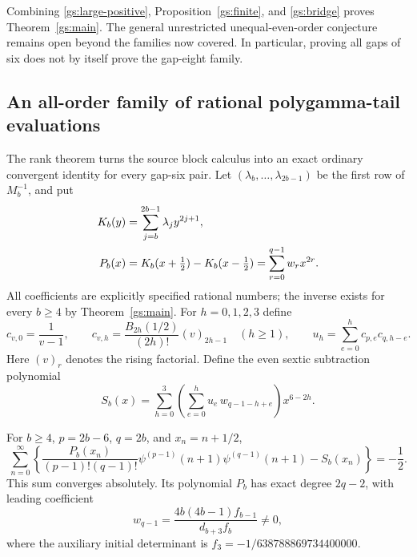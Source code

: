 Combining \eqref{gs:large-positive}, Proposition~\ref{gs:finite}, and
\eqref{gs:bridge} proves Theorem~\ref{gs:main}.  The general
unrestricted unequal-even-order conjecture remains open beyond the
families now covered.  In particular, proving all gaps of six does
not by itself prove the gap-eight family.

\subsection{An all-order family of rational polygamma-tail evaluations}

The rank theorem turns the source block calculus into an exact
ordinary convergent identity for every gap-six pair.  Let
$(\lambda_b,\ldots,\lambda_{2b-1})$ be the first row of $M_b^{-1}$,
and put
\begin{align}
 K_b(y)&=\sum_{j=b}^{2b-1}\lambda_jy^{2j+1},\notag\\
 P_b(x)&=K_b(x+\tfrac12)-K_b(x-\tfrac12)
                  =\sum_{r=0}^{q-1}w_rx^{2r}.\label{gs:polynomial}
\end{align}
All coefficients are explicitly specified rational numbers; the
inverse exists for every $b\ge4$ by Theorem~\ref{gs:main}.
For $h=0,1,2,3$ define
\[
 c_{v,0}=\frac1{v-1},\qquad
 c_{v,h}=\frac{B_{2h}(1/2)}{(2h)!}(v)_{2h-1}\quad(h\ge1),
 \qquad u_h=\sum_{e=0}^hc_{p,e}c_{q,h-e}.
\]
Here $(v)_r$ denotes the rising factorial.  Define the even sextic
subtraction polynomial
\begin{equation}\label{gs:subtraction}
 S_b(x)=\sum_{h=0}^3\left(\sum_{e=0}^hu_e\,w_{q-1-h+e}\right)
                                      x^{6-2h}.
\end{equation}

\begin{corollary}
\label{gs:ordinary}
For $b\ge4$, $p=2b-6$, $q=2b$, and $x_n=n+1/2$,
\begin{equation}\label{gs:ordinary-identity}
 \boxed{\displaystyle
 \sum_{n=0}^{\infty}\left\{
 \frac{P_b(x_n)}{(p-1)!(q-1)!}
       \psi^{(p-1)}(n+1)\psi^{(q-1)}(n+1)-S_b(x_n)
                 \right\}=-\frac12.}
\end{equation}
This sum converges absolutely.  Its polynomial $P_b$ has exact degree
$2q-2$, with leading coefficient
\begin{equation}\label{gs:leading-coefficient}
 w_{q-1}=\frac{4b(4b-1)f_{b-1}}{d_{b+3}f_b}\ne0,
\end{equation}
where the auxiliary initial determinant is
$f_3=-1/638788869734400000$.
\end{corollary}

